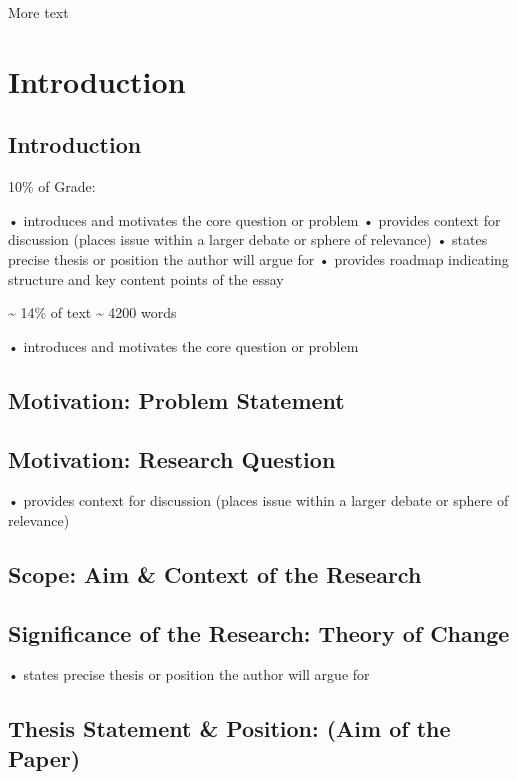 \documentclass[12pt,a4paper]{report}      %
\begin{document}
More text

\chapter{Introduction}\label{introduction}

\section{Introduction}\label{introduction-1}

10\% of Grade:

• introduces and motivates the core question or problem • provides
context for discussion (places issue within a larger debate or sphere of
relevance) • states precise thesis or position the author will argue for
• provides roadmap indicating structure and key content points of the
essay

\textasciitilde{} 14\% of text \textasciitilde{} 4200 words

• introduces and motivates the core question or problem

\section{Motivation: Problem
Statement}\label{motivation-problem-statement}

\section{Motivation: Research
Question}\label{motivation-research-question}

• provides context for discussion (places issue within a larger debate
or sphere of relevance)

\section{Scope: Aim \& Context of the
Research}\label{scope-aim-context-of-the-research}

\section{Significance of the Research: Theory of
Change}\label{significance-of-the-research-theory-of-change}

• states precise thesis or position the author will argue for

\section{Thesis Statement \& Position: (Aim of the
Paper)}\label{thesis-statement-position-aim-of-the-paper}
\end{document}

